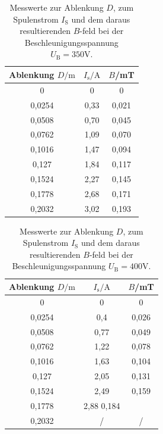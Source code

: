 \begin{table}
  \caption{Messwerte zur Ablenkung $D$, zum Spulenstrom $I_\mathrm{S}$ und dem daraus resultierenden $B$-feld bei der Beschleunigungsspannung $U_\mathrm{B}=350 \si{\volt}$.}
  \centering
  \label{tab:messwerte-c}
  \begin{tabular}{c c c}
    \toprule
      Ablenkung $D/\si{\meter}$ & $I_\mathrm{s}/\si{\ampere}$ & $B$/\si{\milli\tesla}\\
    \midrule
0  & 0 & 0\\
0,0254 & 0,33 & 0,021 \\
0,0508 & 0,70 & 0,045\\
0,0762 & 1,09 & 0,070 \\
0,1016 & 1,47  & 0,094\\
0,127 & 1,84  & 0,117\\
0,1524 & 2,27 & 0,145 \\
0,1778 &2,68  & 0,171\\
0,2032 & 3,02 & 0,193 \\
\bottomrule
\end{tabular}
\end{table}

\begin{table}
  \caption{Messwerte zur Ablenkung $D$, zum Spulenstrom $I_\mathrm{S}$ und dem daraus resultierenden $B$-feld bei der Beschleunigungsspannung $U_\mathrm{B}=400 \si{\volt}$.}
  \centering
  \label{tab:messwerte-d}
  \begin{tabular}{c c c}
    \toprule
      Ablenkung $D/\si{\meter}$ & $I_\mathrm{s}/\si{\ampere}$ & $B$/\si{\milli\tesla}\\
    \midrule
0  & 0 &  0\\
0,0254 & 0,4 & 0,026\\
0,0508 & 0,77 & 0,049\\
0,0762 & 1,22 & 0,078 \\
0,1016 & 1,63  & 0,104\\
0,127 & 2,05 & 0,131\\
0,1524 & 2,49 & 0,159 \\
0,1778 & 2,88  0,184\\
0,2032 & / & /\\
\bottomrule
\end{tabular}
\end{table}

